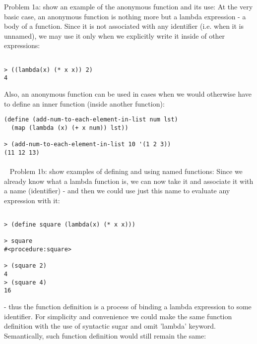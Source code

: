 \documentclass{article}
\begin{document}
Problem 1a: show an example of the anonymous function and its use:
\newline
\newline
At the very basic case, an anonymous function is nothing more but a lambda expression - a body of a function. Since it is not associated with any identifier (i.e. when it is unnamed), we may use it only when we explicitly write it inside of other expressions:
\ttfamily
	
\begin{verbatim} 

> ((lambda(x) (* x x)) 2) 
4

\end{verbatim}

\rmfamily
\noindent Also, an anonymous function can be used in cases when we would otherwise have to define an inner function (inside another function):

\begin{verbatim} 
(define (add-num-to-each-element-in-list num lst)
  (map (lambda (x) (+ x num)) lst))
  
> (add-num-to-each-element-in-list 10 '(1 2 3))
(11 12 13)

\end{verbatim}

\paragraph{}\
\rmfamily
Problem 1b: show examples of defining and using named functions:
\newline
\newline
Since we already know what a lambda function is, we can now take it and associate it with a name (identifier) - and then we could use just this name to evaluate any expression with it:

\begin{verbatim} 
 
> (define square (lambda(x) (* x x)))

> square
#<procedure:square>

> (square 2)
4
> (square 4)
16
\end{verbatim}
- thus the function definition is a process of binding a lambda expression to some identifier. For simplicity and convenience we could make the same function definition with the use of syntactic sugar and omit 'lambda' keyword. Semantically, such function definition would still remain the same:
\end{document}
